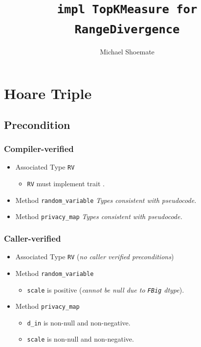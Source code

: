 \documentclass{article}
\title{\texttt{impl TopKMeasure for RangeDivergence}}
\author{Michael Shoemate}
\begin{document}
  
\maketitle 
 
\section{Hoare Triple} 
\subsection*{Precondition} 
\subsubsection*{Compiler-verified}
\begin{itemize}
    \item Associated Type \texttt{RV}
        \begin{itemize}
            \item \texttt{RV} must implement trait .
        \end{itemize}
    \item Method \texttt{random\_variable}
        \textit{Types consistent with pseudocode.}
    \item Method \texttt{privacy\_map}
        \textit{Types consistent with pseudocode.}
\end{itemize}

\subsubsection*{Caller-verified}
\begin{itemize}
    \item Associated Type \texttt{RV} (\textit{no caller verified preconditions})
    \item Method \texttt{random\_variable}
        \begin{itemize}
            \item \texttt{scale} is positive (\textit{cannot be null due to \texttt{FBig} dtype}).
        \end{itemize}
    \item Method \texttt{privacy\_map}
        \begin{itemize}
            \item \texttt{d\_in} is non-null and non-negative.
            \item \texttt{scale} is non-null and non-negative.
        \end{itemize}
\end{itemize}
\end{document}
